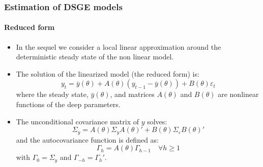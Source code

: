 \documentclass[10pt,slidestop]{beamer}
\begin{document}
\begin{frame}
  \frametitle{Estimation of DSGE models}
  \framesubtitle{Reduced form}
  \begin{itemize}
    \item In the sequel we consider a local linear approximation
      around the deterministic steady state of the non linear model.
      \bigskip
    \item The solution of the linearized model (the reduced form)
      is:
      \[
      y_t = \bar y(\theta) + A(\theta) \left( y_{t-1} - \bar y(\theta)\right) + B(\theta)\varepsilon_t
      \]
      where the steady state, $\bar y(\theta)$, and matrices
      $A(\theta)$ and $B(\theta)$ are nonlinear functions of the deep
      parameters.
      \bigskip
    \item The unconditional covariance matrix of $y$ solves:
      \[
      \Sigma_y = A(\theta)\Sigma_yA(\theta)' + B(\theta)\Sigma_{\varepsilon}B(\theta)'
      \]
      and the autocovariance function is defined as:
      \[
      \Gamma_h = A(\theta)\Gamma_{h-1}\quad\forall h\geq 1
      \]
      with $\Gamma_0 =\Sigma_y $ and $\Gamma_{-h} = \Gamma_h'$.
  \end{itemize}

\end{frame}
\end{document}
